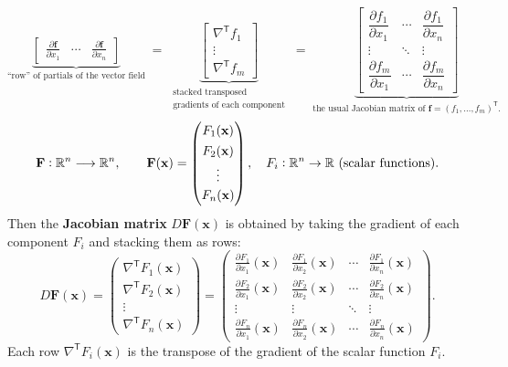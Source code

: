 \documentclass[11pt,openany]{article}
\renewcommand{\vec}[1]{\mathbf{#1}}
\renewcommand{\emph}[1]{\textbf{#1}}
\begin{document}
\[
\underbrace{
	\begin{bmatrix}
		\displaystyle \frac{\partial \mathbf f}{\partial x_1}
		& \cdots
		& \displaystyle \frac{\partial \mathbf f}{\partial x_n}
	\end{bmatrix}
}_{\text{``row'' of partials of the vector field}}
\;=\;
\underbrace{
	\begin{bmatrix}
		\nabla^{\mathsf T}f_1 \\[6pt]
		\vdots\\[2pt]
		\nabla^{\mathsf T}f_m
	\end{bmatrix}
}_{\substack{\text{stacked transposed}\\\text{gradients of each component}}}
\;=\;
\underbrace{
	\begin{bmatrix}
		\dfrac{\partial f_1}{\partial x_1} & \cdots & \dfrac{\partial f_1}{\partial x_n}\\[8pt]
		\vdots                              & \ddots & \vdots\\[4pt]
		\dfrac{\partial f_m}{\partial x_1} & \cdots & \dfrac{\partial f_m}{\partial x_n}
	\end{bmatrix}
}_{\text{the usual Jacobian matrix of } \mathbf f = (f_1,\dots,f_m)^\mathsf T.}
\]
\[
\vec F:\R^n\longrightarrow\R^n,
\qquad
\vec F(\vec x)
=\begin{pmatrix}
	F_1(\vec x)\\[4pt]
	F_2(\vec x)\\[2pt]
	\vdots\\[2pt]
	F_n(\vec x)
\end{pmatrix},
\quad
F_i:\R^n\to\R\ (\text{scalar functions}).
\]
Then the \emph{Jacobian matrix} \(D\vec F(\vec x)\) is obtained by taking the gradient of each component \(F_i\) and stacking them as rows:
\[
D\vec F(\vec x)
=\begin{pmatrix}
	\nabla^{\mathsf T}F_1(\vec x)\\[6pt]
	\nabla^{\mathsf T}F_2(\vec x)\\[2pt]
	\vdots\\[2pt]
	\nabla^{\mathsf T}F_n(\vec x)
\end{pmatrix}
=
\begin{pmatrix}
	\displaystyle \frac{\partial F_1}{\partial x_1}(\vec x)
	&\displaystyle \frac{\partial F_1}{\partial x_2}(\vec x)
	&\cdots
	&\displaystyle \frac{\partial F_1}{\partial x_n}(\vec x)\\[10pt]
	\displaystyle \frac{\partial F_2}{\partial x_1}(\vec x)
	&\displaystyle \frac{\partial F_2}{\partial x_2}(\vec x)
	&\cdots
	&\displaystyle \frac{\partial F_2}{\partial x_n}(\vec x)\\[10pt]
	\vdots & \vdots & \ddots & \vdots\\[6pt]
	\displaystyle \frac{\partial F_n}{\partial x_1}(\vec x)
	&\displaystyle \frac{\partial F_n}{\partial x_2}(\vec x)
	&\cdots
	&\displaystyle \frac{\partial F_n}{\partial x_n}(\vec x)
\end{pmatrix}.
\]
Each row \(\nabla^{\mathsf T}F_i(\vec x)\) is the transpose of the gradient of the scalar function \(F_i\).
\end{document}
